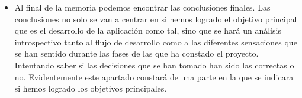 \begin{itemize}
    \item Al final de la memoria podemos encontrar las conclusiones finales. Las conclusiones no solo se van a centrar en si hemos logrado el objetivo principal que es el desarrollo de la aplicación como tal, sino que se hará un análisis introspectivo tanto al flujo de desarrollo como a las diferentes sensaciones que se han sentido durante las fases de las que ha constado el proyecto. Intentando saber si las decisiones que se han tomado han sido las correctas o no. Evidentemente este apartado constará de una parte en la que se indicara si hemos logrado los objetivos principales. 
\end{itemize}